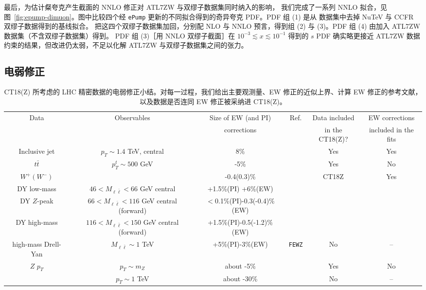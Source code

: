 最后，为估计粲夸克产生截面的 NNLO 修正对 ATL7ZW 与双缪子数据集同时纳入的影响，
我们完成了一系列 NNLO 拟合，见图~\ref{fig:epump-dimuon}。图中比较四个经 \texttt{ePump} 更新的不同拟合得到的奇异夸克 PDF。PDF 组 (1)
是从 \CTHERAII{} 数据集中去掉 NuTeV 与 CCFR 双缪子数据得到的基线拟合。
把这四个双缪子数据集加回，分别配 NLO 与 NNLO 预言，得到组 (2) 与 (3)。PDF 组 (4)
由加入 ATL7ZW 数据集（不含双缪子数据集）得到。
PDF 组 (3)［用 NNLO 双缪子截面］在 $10^{-3}\! \lesssim\! x\! \lesssim\! 10^{-1}$ 得到的 $s$ PDF 确实略更接近 ATL7ZW 数据约束的结果，但改进仍太弱，不足以化解 ATL7ZW 与双缪子数据集之间的张力。

\subsection{电弱修正}
\label{sec:EW}

\begin{table}
\caption{CT18(Z) 所考虑的 LHC 精密数据的电弱修正小结。对每一过程，我们给出主要观测量、EW 修正的近似上界、计算 EW 修正的参考文献，以及数据是否连同 EW 修正被采纳进 CT18(Z)。}
\label{tab:EWcorrections}
\hspace*{-0.75cm}\begin{tabular}{c|c|c|c|c|c}
\hline
\multirow{2}{*}{Data} & \multirow{2}{*}{Observables}  & Size of EW (and PI)  & Ref. & Data included & EW corrections  \\
 &    & corrections & & in the CT18(Z)? & included in the fits\\
\hline
	Inclusive jet & $p_{T}\sim1.4$ TeV, central  & 8\%  & \cite{Dittmaier:2012kx} & Yes & Yes \\
\hline
	$t\bar{t}$ &$p_{T}^{t}\sim500$ GeV   &  -5\% & \cite{Czakon:2017wor} & Yes & No \\
\hline
$W^{+}(W^{-})$ &     & -0.4(0.3)\%  & \multirow{4}{*}{\cite{Aaboud:2016btc}} & \multirow{4}{*}{CT18Z} & \multirow{4}{*}{Yes}  \\
DY low-mass & $46<M_{\ell \bar \ell}<66$ GeV central  & +1.5\%(PI) +6\%(EW) &  &     \\
DY $Z$-peak  & $66<M_{\ell \bar \ell}<116$ GeV central (forward) & $<$0.1\%(PI)-0.3(-0.4)\%(EW)  & & \\
DY high-mass &$116<M_{\ell \bar \ell}<150$ GeV central (forward) & +1.5\%(PI)-0.5(-1.2)\% (EW) & & \\
\hline
high-mass Drell-Yan & $M_{\ell \bar \ell}\sim1$ TeV  & +5\%(PI)-3\%(EW)  & \texttt{FEWZ} & No  & -- \\
\hline
\multirow{2}{*}{$Z$ $p_{T}$} & $p_{T}\sim m_Z$ & about -5\%   & \cite{Kallweit:2015fta} & Yes & No \\
 & $p_{T}\sim1$ TeV & about -30\%   & \cite{Kallweit:2015fta} & No & --  \\
\hline
\end{tabular}
\end{table}

